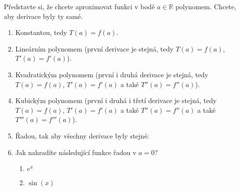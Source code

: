 Představte si, že chcete aproximovat funkci v bodě $a \in \mathbb{R}$ polynomem.
Chcete, aby derivace byly ty samé.

\begin{enumerate}
		
	\item  Konstantou, tedy $T(a) = f(a)$.


	\item  Lineárním polynomem (první derivace je stejná, tedy  $T(a) = f(a)$, $T'(a) = f'(a)$).


	\item  Kvadratickým polynomem (první i druhá derivace je stejná, tedy $T(a) = f(a)$, $T'(a) = f'(a)$ a také $T''(a) = f''(a)$).


	\item  Kubickým polynomem (první i druhá i třetí derivace je stejná, tedy $T(a) = f(a)$, $T'(a) = f'(a)$ a také $T''(a) = f''(a)$ a také $T'''(a) = f'''(a)$).


	\item  Řadou, tak aby všechny derivace byly stejné:


	\item  Jak nahradíte následující funkce řadou v $a = 0$?

		\begin{enumerate}

			\item  $e^x$


			\item  $\sin(x)$

\end{enumerate}
\end{enumerate}
